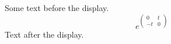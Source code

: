 \documentclass[12pt]{article}
\begin{document}
Some text before the display.
\[ e^{\begin{pmatrix} 0 & t \\ -t & 0 \end{pmatrix}} \]
Text after the display.
\end{document}

